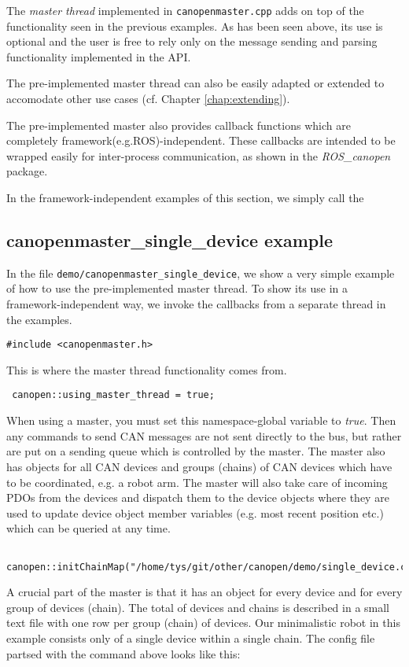 The {\em master thread} implemented in \texttt{canopenmaster.cpp} adds on top of the functionality seen in the previous examples. As has been seen above, its use is optional and the user is free to rely only on the message sending and parsing functionality implemented in the API.

The pre-implemented master thread can also be easily adapted or extended to accomodate other use cases (cf. Chapter \ref{chap:extending}).

The pre-implemented master also provides callback functions which are completely framework(e.g.ROS)-independent. These callbacks are intended to be wrapped easily for inter-process communication, as shown in the  {\em ROS\_canopen} package. 

In the framework-independent examples of this section, we simply call the 

\subsection{canopenmaster\_single\_device example}

In the file \texttt{demo/canopenmaster\_single\_device}, we show a very simple example of how to use the pre-implemented master thread. To show its use in a framework-independent way, we invoke the callbacks from a separate thread in the examples. 

\begin{verbatim}
#include <canopenmaster.h>
 \end{verbatim}
This is where the master thread functionality comes from.

\begin{verbatim}
 canopen::using_master_thread = true;
 \end{verbatim}
When using a master, you must set this namespace-global variable to {\em true}. Then any commands to send CAN messages are not sent directly to the bus, but rather are put on a sending queue which is controlled by the master. The master also has objects for all CAN devices and groups (chains) of CAN devices which have to be coordinated, e.g. a robot arm. The master will also take care of incoming PDOs from the devices and dispatch them to the device objects where they are used to update device object member variables (e.g. most recent position etc.) which can be queried at any time.

\begin{verbatim}
 canopen::initChainMap("/home/tys/git/other/canopen/demo/single_device.csv");
\end{verbatim}
A crucial part of the master is that it has an object for every device and for every group of devices (chain). The total of devices and chains is described in a small text file with one row per group (chain) of devices. Our minimalistic robot in this example consists only of a single device within a single chain. The config file partsed with the command above looks like this:

